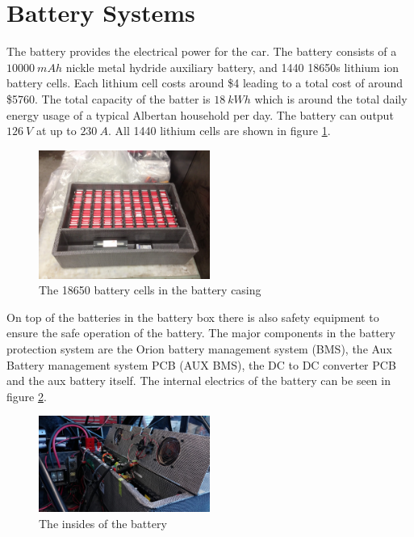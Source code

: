 \documentclass[titlepage]{article}
\begin{document}
    \section{Battery Systems}
    The battery provides the electrical power for the car. The battery
    consists of a $10 000\ mAh$ nickle metal hydride auxiliary battery,
    and 1440 18650s lithium ion battery cells. Each lithium cell costs
    around \$4 leading to a total cost of around \$5760. The total
    capacity of the batter is $18\ kWh$ which is around the total daily
    energy usage of a typical Albertan household per day. The battery
    can output $126\ V$ at up to $230\ A$. All 1440 lithium cells are
    shown in figure \ref{fig:bat_cells}.
    \begin{figure}
        \centering
        \includegraphics[width=0.5\textwidth]{images/cells.jpg}
        \caption{The 18650 battery cells in the battery casing}
        \label{fig:bat_cells}
    \end{figure}
    On top of the batteries in the battery box there is also safety
    equipment to ensure the safe operation of the battery. The major
    components in the battery protection system are the Orion battery
    management system (BMS), the Aux Battery management system PCB
    (AUX BMS), the DC to DC converter PCB and the aux battery itself.
    The internal electrics of the battery can be seen in figure
    \ref{fig:bat-in}.
    \begin{figure}
        \centering
        \includegraphics[width=0.5\textwidth]{images/batt-elec.jpg}
        \caption{The insides of the battery}
        \label{fig:bat-in}
    \end{figure}
\end{document}

